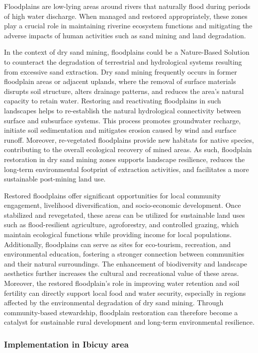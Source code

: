 Floodplains are low-lying areas around rivers that naturally flood during periods of high water discharge. When managed and restored appropriately, these zones play a crucial role in maintaining riverine ecosystem functions and mitigating the adverse impacts of human activities such as sand mining and land degradation.

In the context of dry sand mining, floodplains could be a Nature-Based Solution to counteract the degradation of terrestrial and hydrological systems resulting from excessive sand extraction. Dry sand mining frequently occurs in former floodplain areas or adjacent uplands, where the removal of surface materials disrupts soil structure, alters drainage patterns, and reduces the area’s natural capacity to retain water. Restoring and reactivating floodplains in such landscapes helps to re-establish the natural hydrological connectivity between surface and subsurface systems. This process promotes groundwater recharge, initiate soil sedimentation and mitigates erosion caused by wind and surface runoff. Moreover, re-vegetated floodplains provide new habitats for native species, contributing to the overall ecological recovery of mined areas. As such, floodplain restoration in dry sand mining zones supports landscape resilience, reduces the long-term environmental footprint of extraction activities, and facilitates a more sustainable post-mining land use.

Restored floodplains offer significant opportunities for local community engagement, livelihood diversification, and socio-economic development. Once stabilized and revegetated, these areas can be utilized for sustainable land uses such as flood-resilient agriculture, agroforestry, and controlled grazing, which maintain ecological functions while providing income for local populations. Additionally, floodplains can serve as sites for eco-tourism, recreation, and environmental education, fostering a stronger connection between communities and their natural surroundings. The enhancement of biodiversity and landscape aesthetics further increases the cultural and recreational value of these areas. Moreover, the restored floodplain’s role in improving water retention and soil fertility can directly support local food and water security, especially in regions affected by the environmental degradation of dry sand mining. Through community-based stewardship, floodplain restoration can therefore become a catalyst for sustainable rural development and long-term environmental resilience.

\subsubsection{Implementation in Ibicuy area}

